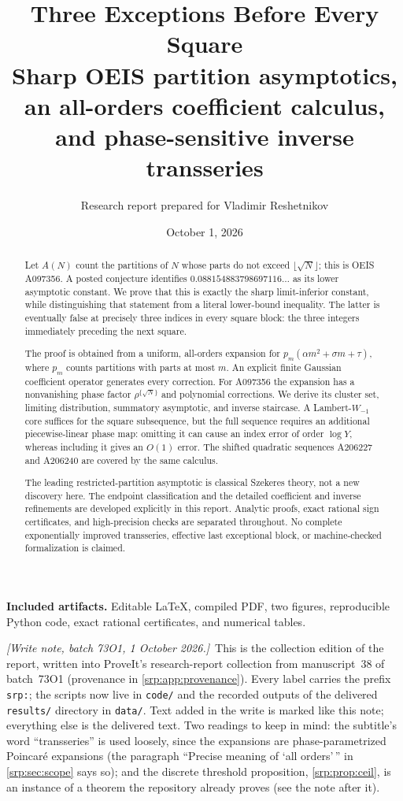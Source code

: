 \documentclass[11pt,a4paper]{article}
\title{\textbf{Three Exceptions Before Every Square}\\[5pt]
\large Sharp OEIS partition asymptotics, an all-orders coefficient calculus,\\
and phase-sensitive inverse transseries}
\author{Research report prepared for Vladimir Reshetnikov}
\date{October 1, 2026}
\numberwithin{equation}{section}
\theoremstyle{definition}
\theoremstyle{remark}
\newcommand{\writenote}[1]{\par\smallskip\noindent
 \textit{[Write note, batch 73O1, 1 October 2026.]}\ #1\par\smallskip}
\begin{document}
\maketitle
\begin{abstract}
Let $A(N)$ count the partitions of $N$ whose parts do not exceed
$\lfloor\sqrt N\rfloor$; this is OEIS A097356. A posted conjecture identifies
$0.088154883798697116\ldots$ as its lower asymptotic constant. We prove that
this is exactly the sharp limit-inferior constant, while distinguishing that
statement from a literal lower-bound inequality. The latter is eventually
false at precisely three indices in every square block: the three integers
immediately preceding the next square.

The proof is obtained from a uniform, all-orders expansion for
$p_m(\alpha m^2+\sigma m+\tau)$, where $p_m$ counts partitions with parts at
most $m$. An explicit finite Gaussian coefficient operator generates every
correction. For A097356 the expansion has a nonvanishing phase factor
$\rho^{\{\sqrt N\}}$ and polynomial corrections. We derive its cluster set,
limiting distribution, summatory asymptotic, and inverse staircase. A
Lambert-$W_{-1}$ core suffices for the square subsequence, but the full
sequence requires an additional piecewise-linear phase map: omitting it
can cause an index error of order $\log Y$, whereas including it gives an
$O(1)$ error. The shifted quadratic sequences A206227 and A206240 are
covered by the same calculus.

The leading restricted-partition asymptotic is classical Szekeres theory,
not a new discovery here. The endpoint classification and the detailed
coefficient and inverse refinements are developed explicitly in this
report. Analytic proofs, exact rational sign certificates, and
high-precision checks are separated throughout. No complete
exponentially improved transseries, effective last exceptional block,
or machine-checked formalization is claimed.
\end{abstract}
\vspace{3pt}
\noindent\textbf{Included artifacts.} Editable \LaTeX, compiled PDF, two figures,
reproducible Python code, exact rational certificates, and numerical tables.

\writenote{This is the collection edition of the report, written into
ProveIt's research-report collection from manuscript~38 of batch~73O1
(provenance in \cref{srp:app:provenance}). Every label carries the
prefix \texttt{srp:}; the scripts now live in \texttt{code/} and the
recorded outputs of the delivered \texttt{results/} directory in
\texttt{data/}. Text added in the write is marked like this note;
everything else is the delivered text. Two readings to keep in mind:
the subtitle's word ``transseries'' is used loosely, since the expansions
are phase-parametrized Poincar\'e expansions (the paragraph ``Precise
meaning of `all orders'\,'' in \cref{srp:sec:scope} says so); and the
discrete threshold proposition, \cref{srp:prop:ceil}, is an instance of a
theorem the repository already proves (see the note after it).}
\end{document}
